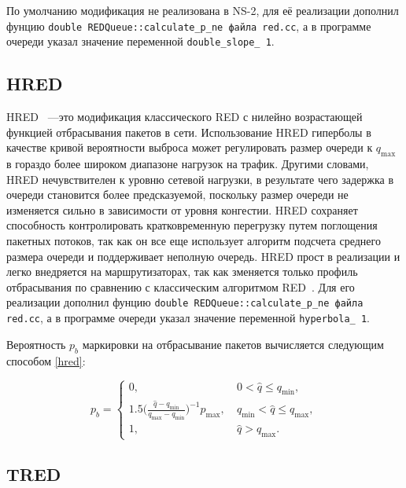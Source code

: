 По умолчанию модификация не реализована в NS-2, для её реализации дополнил фунцию \verb|double REDQueue::calculate_p_ne файла red.cc|, а в программе очереди указал значение переменной \verb|double_slope_ 1|. 


\subsection{HRED}

HRED ~---это модификация классического RED с нилейно возрастающей функцией отбрасывания пакетов в сети.
Использование HRED гиперболы в качестве кривой вероятности выброса может регулировать размер очереди к $q_{\max}$ 
в гораздо более широком диапазоне нагрузок на трафик. Другими словами, HRED нечувствителен к уровню сетевой нагрузки, 
в результате чего задержка в очереди становится более предсказуемой, поскольку размер очереди не изменяется сильно в 
зависимости от уровня конгестии. HRED сохраняет способность контролировать кратковременную перегрузку путем поглощения 
пакетных потоков, так как он все еще использует алгоритм подсчета среднего размера очереди и поддерживает неполную очередь. 
HRED прост в реализации и легко внедряется на маршрутизаторах, так как зменяется только профиль отбрасывания по сравнению с 
классическим алгоритмом RED~\cite{HRED}. Для его реализации дополнил фунцию \verb|double REDQueue::calculate_p_ne файла red.cc|, 
а в программе очереди указал значение переменной \verb|hyperbola_ 1|.
 
Вероятность $p_{b}$ маркировки на
отбрасывание пакетов вычисляется следующим способом \eqref{hred}:

\begin{equation}
\label{hred}
p_{b} = \begin{cases}
        0, &  \ 0 < \hat{q} \leqslant q_{\min},
        \\
        1.5({\frac{\hat{q} - q_{\min}}{q_{\max} - q_{\min}})^{-1}} {p_{\max}}, & \ q_{\min} < \hat{q} \leqslant q_{\max},
        \\
        1, &  \ \hat{q} > q_{\max}.
\end{cases}
\end{equation}


\subsection{TRED}

